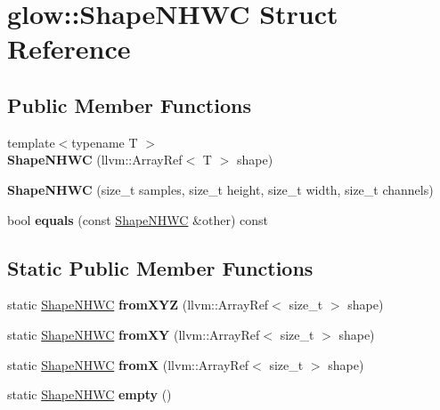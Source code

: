 \hypertarget{structglow_1_1_shape_n_h_w_c}{}\section{glow\+:\+:Shape\+N\+H\+WC Struct Reference}
\label{structglow_1_1_shape_n_h_w_c}
\subsection*{Public Member Functions}
\begin{DoxyCompactItemize}
\item 
\mbox{\label{structglow_1_1_shape_n_h_w_c_a89b03968442ba8c6957992c49429281b}} 
{\footnotesize template$<$typename T $>$ }\\{\bfseries Shape\+N\+H\+WC} (llvm\+::\+Array\+Ref$<$ T $>$ shape)
\item 
\mbox{\label{structglow_1_1_shape_n_h_w_c_a5197d9816c0f153fc863fd631a1852bf}} 
{\bfseries Shape\+N\+H\+WC} (size\+\_\+t samples, size\+\_\+t height, size\+\_\+t width, size\+\_\+t channels)
\item 
\mbox{\label{structglow_1_1_shape_n_h_w_c_a6c0e4664875edc21286f2ee12bd5ac9e}} 
bool {\bfseries equals} (const \hyperlink{structglow_1_1_shape_n_h_w_c}{Shape\+N\+H\+WC} \&other) const
\end{DoxyCompactItemize}
\subsection*{Static Public Member Functions}
\begin{DoxyCompactItemize}
\item 
\mbox{\label{structglow_1_1_shape_n_h_w_c_af0f769adefa5c8dbafa9d4b2078c0b18}} 
static \hyperlink{structglow_1_1_shape_n_h_w_c}{Shape\+N\+H\+WC} {\bfseries from\+X\+YZ} (llvm\+::\+Array\+Ref$<$ size\+\_\+t $>$ shape)
\item 
\mbox{\label{structglow_1_1_shape_n_h_w_c_a01fb91e3861f146ba37dcb8cd48ce0e6}} 
static \hyperlink{structglow_1_1_shape_n_h_w_c}{Shape\+N\+H\+WC} {\bfseries from\+XY} (llvm\+::\+Array\+Ref$<$ size\+\_\+t $>$ shape)
\item 
\mbox{\label{structglow_1_1_shape_n_h_w_c_ac8c9f058d0eaafd3ba0c2e644c794d09}} 
static \hyperlink{structglow_1_1_shape_n_h_w_c}{Shape\+N\+H\+WC} {\bfseries fromX} (llvm\+::\+Array\+Ref$<$ size\+\_\+t $>$ shape)
\item 
\mbox{\label{structglow_1_1_shape_n_h_w_c_acc3b319715496406023e0ef5c1686c0e}} 
static \hyperlink{structglow_1_1_shape_n_h_w_c}{Shape\+N\+H\+WC} {\bfseries empty} ()
\end{DoxyCompactItemize}
